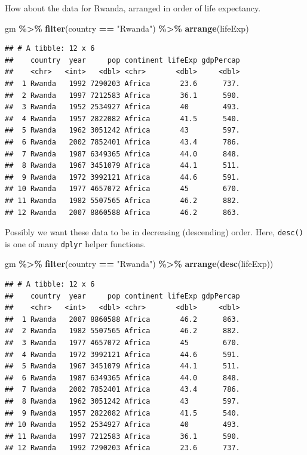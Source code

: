 \documentclass[
]{krantz}
\newenvironment{Shaded}{\begin{snugshade}}{\end{snugshade}}
\newcommand{\KeywordTok}[1]{\textcolor[rgb]{0.13,0.29,0.53}{\textbf{#1}}}
\newcommand{\NormalTok}[1]{#1}
\newcommand{\OperatorTok}[1]{\textcolor[rgb]{0.81,0.36,0.00}{\textbf{#1}}}
\newcommand{\StringTok}[1]{\textcolor[rgb]{0.31,0.60,0.02}{#1}}
\begin{document}
How about the data for Rwanda, arranged in order of life expectancy.

\begin{Shaded}
\begin{Highlighting}[]
\NormalTok{gm }\OperatorTok{\%\textgreater{}\%}\StringTok{ }
\StringTok{  }\KeywordTok{filter}\NormalTok{(country }\OperatorTok{==}\StringTok{ "Rwanda"}\NormalTok{) }\OperatorTok{\%\textgreater{}\%}\StringTok{ }
\StringTok{  }\KeywordTok{arrange}\NormalTok{(lifeExp)}
\end{Highlighting}
\end{Shaded}

\begin{verbatim}
## # A tibble: 12 x 6
##    country  year     pop continent lifeExp gdpPercap
##    <chr>   <int>   <dbl> <chr>       <dbl>     <dbl>
##  1 Rwanda   1992 7290203 Africa       23.6      737.
##  2 Rwanda   1997 7212583 Africa       36.1      590.
##  3 Rwanda   1952 2534927 Africa       40        493.
##  4 Rwanda   1957 2822082 Africa       41.5      540.
##  5 Rwanda   1962 3051242 Africa       43        597.
##  6 Rwanda   2002 7852401 Africa       43.4      786.
##  7 Rwanda   1987 6349365 Africa       44.0      848.
##  8 Rwanda   1967 3451079 Africa       44.1      511.
##  9 Rwanda   1972 3992121 Africa       44.6      591.
## 10 Rwanda   1977 4657072 Africa       45        670.
## 11 Rwanda   1982 5507565 Africa       46.2      882.
## 12 Rwanda   2007 8860588 Africa       46.2      863.
\end{verbatim}

Possibly we want these data to be in decreasing (descending) order. Here, \texttt{desc()} is one of many \texttt{dplyr} helper functions.

\begin{Shaded}
\begin{Highlighting}[]
\NormalTok{gm }\OperatorTok{\%\textgreater{}\%}\StringTok{ }
\StringTok{  }\KeywordTok{filter}\NormalTok{(country }\OperatorTok{==}\StringTok{ "Rwanda"}\NormalTok{) }\OperatorTok{\%\textgreater{}\%}\StringTok{ }
\StringTok{  }\KeywordTok{arrange}\NormalTok{(}\KeywordTok{desc}\NormalTok{(lifeExp))}
\end{Highlighting}
\end{Shaded}

\begin{verbatim}
## # A tibble: 12 x 6
##    country  year     pop continent lifeExp gdpPercap
##    <chr>   <int>   <dbl> <chr>       <dbl>     <dbl>
##  1 Rwanda   2007 8860588 Africa       46.2      863.
##  2 Rwanda   1982 5507565 Africa       46.2      882.
##  3 Rwanda   1977 4657072 Africa       45        670.
##  4 Rwanda   1972 3992121 Africa       44.6      591.
##  5 Rwanda   1967 3451079 Africa       44.1      511.
##  6 Rwanda   1987 6349365 Africa       44.0      848.
##  7 Rwanda   2002 7852401 Africa       43.4      786.
##  8 Rwanda   1962 3051242 Africa       43        597.
##  9 Rwanda   1957 2822082 Africa       41.5      540.
## 10 Rwanda   1952 2534927 Africa       40        493.
## 11 Rwanda   1997 7212583 Africa       36.1      590.
## 12 Rwanda   1992 7290203 Africa       23.6      737.
\end{verbatim}
\end{document}
